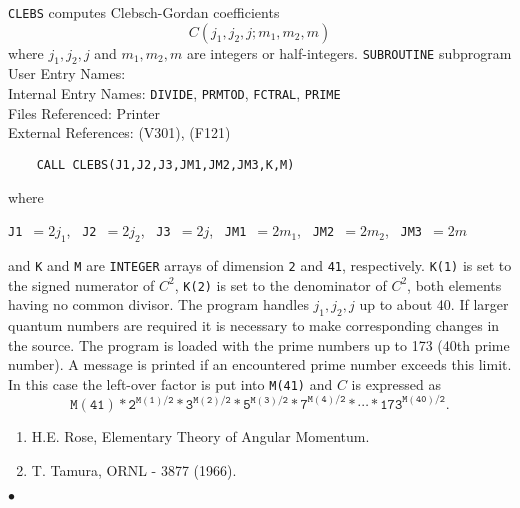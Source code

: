                             
                         
\Submitter{}                                
                          
{\tt CLEBS} computes Clebsch-Gordan coefficients
$$ C(j_1,j_2,j;m_1,m_2,m) $$
where $j_1,j_2,j$ and $m_1,m_2,m$ are integers or half-integers.
\Structure
{\tt SUBROUTINE} subprogram \\
User Entry Names: \\
Internal Entry Names: {\tt DIVIDE}, {\tt PRMTOD}, {\tt FCTRAL},
{\tt PRIME}\\
Files Referenced: Printer\\
External References:  (V301),   (F121)
\Usage
\begin{verbatim}
    CALL CLEBS(J1,J2,J3,JM1,JM2,JM3,K,M)
\end{verbatim}
where
\begin{center}
{\tt J1 }$ = 2j_1$, \ {\tt J2 }$ = 2j_2$, \ {\tt J3 }$ = 2j$,
\ {\tt JM1 }$ = 2m_1$, \ {\tt JM2 }$ = 2m_2$, \ {\tt JM3 }$ = 2m$
\end{center}
and {\tt K} and {\tt M} are {\tt INTEGER} arrays of dimension {\tt 2}
and {\tt 41}, respectively. {\tt K(1)} is set to the signed
numerator of $C^2$, {\tt K(2)} is set to the denominator of $C^2$,
both elements having no common divisor.
\Restrict
The program handles $j_1,j_2,j$ up to about 40. If larger quantum
numbers are required it is necessary to make corresponding changes in
the source.
\Errorh
The program is loaded with the prime numbers up to 173
(40th prime number). A message is printed if an encountered prime number
exceeds this limit. In this case the left-over factor is put into
{\tt M(41)} and $C$ is expressed as
$$
\mathtt{M(41)*2^{M(1)/2}*3^{M(2)/2}*5^{M(3)/2}*7^{M(4)/2}*\cdots *
173^{M(40)/2}}.$$
\Refer
\begin{enumerate}
\item H.E. Rose, Elementary Theory of Angular Momentum.
\item T. Tamura, ORNL - 3877 (1966).
\end{enumerate}
$\bullet$
